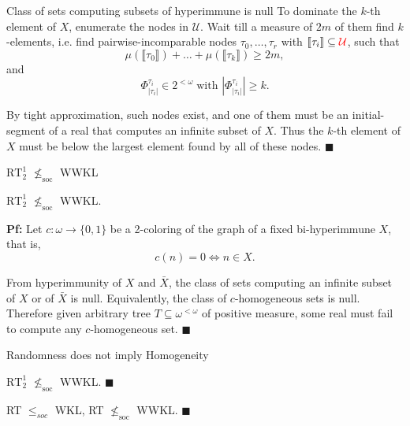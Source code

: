 \begin{frame}{Class of sets computing subsets of hyperimmune is null}
  To dominate the $k$-th element of $X$, enumerate the nodes in
  $\mathcal{U}$. Wait till a measure of $2m$ of them find $k$-elements,
  i.e. find pairwise-incomparable nodes $\tau_0,\ldots,\tau_r$ with
  $\llbracket\tau_i\rrbracket \subseteq \textcolor{red}{\mathcal{U}}$, such
  that
  \[\mu(\llbracket\tau_0\rrbracket) +\ldots
  +\mu(\llbracket\tau_k\rrbracket) \geq 2m,\]
  and
  \[\Phi^{\tau_i}_{|\tau_i|} \in 2^{<\omega}\; \text{with }
  |\Phi^{\tau_i}_{|\tau_i|}|\geq k.\]

  \vspace{2em}
  By tight approximation, such nodes exist, and one of them must be an
  initial-segment of a real that computes an infinite subset of $X$. Thus
  the $k$-th element of $X$ must be below the largest element found by all
  of these nodes. $\blacksquare$
\end{frame}

\begin{frame}{$\text{RT}_2^1$ $\nleq_{\text{soc}}$ WWKL}
  \begin{thm}
    $\text{RT}_2^1$ $\nleq_{\text{soc}}$ WWKL.
  \end{thm}

  \vspace{1em}
  \textbf{Pf:} Let $c:\omega\rightarrow\{0,1\}$ be a 2-coloring of the
  graph of a fixed bi-hyperimmune $X$, that is,
  \[c(n)=0 \Leftrightarrow n\in X.\]
  
  From hyperimmunity of $X$ and $\bar{X}$, the class of sets computing an
  infinite subset of $X$ or of $\bar{X}$ is null. Equivalently, the class
  of $c$-homogeneous sets is null. Therefore given arbitrary tree
  $T\subseteq\omega^{<\omega}$ of positive measure, some real must fail to
  compute any $c$-homogeneous set. $\blacksquare$
\end{frame}

\begin{frame}{Randomness does not imply Homogeneity}
  \begin{coro}
    $\text{RT}_2^1$ $\nleq_{\text{soc}}$ WWKL. $\blacksquare$
  \end{coro}
  \begin{coro}
    RT $\leq_{soc}$ WKL, RT $\nleq_{\text{soc}}$ WWKL. $\blacksquare$
  \end{coro}

  \vspace{1em}
  \begin{center}
  \end{center}
\end{frame}
